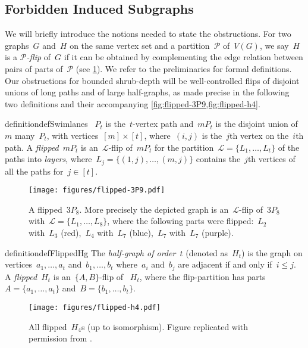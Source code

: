 \documentclass[11pt]{article}      \usepackage[margin=1in]{geometry}  \usepackage{microtype}
\theoremstyle{definition}
\newcommand{\LL}{\mathcal{L}}
\newcommand{\PP}{\mathcal{P}}
\renewcommand{\le}{\leqslant}
\renewcommand{\leq}{\le}
\begin{document}
\subsection*{Forbidden Induced Subgraphs}
We will briefly introduce the notions needed to state the obstructions.
For two graphs~$G$ and~$H$ on the same vertex set and a partition~$\PP$ of~$V(G)$, we say~$H$ is a \emph{$\PP$-flip} of~$G$ if it can be obtained by complementing the edge relation between pairs of parts of~$\PP$ (see \cref{fig:flipped-3P9}).
We refer to the preliminaries for formal definitions.
Our obstructions for bounded shrub-depth will be well-controlled flips of disjoint unions of long paths and of large half-graphs, as made precise in the following two definitions and their accompanying \cref{fig:flipped-3P9,fig:flipped-h4}.

\begin{restatable}{definition}{defSwimlanes}
  \label{def:tpt}
 ~$P_t$ is the~$t$-vertex path and~$mP_t$ is the disjoint union of~$m$ many~$P_t$, with vertices~$[m]\times [t]$, where~$(i,j)$ is the~$j$th vertex on the~$i$th path.
  A \emph{flipped}~$mP_t$ is an~$\LL$-flip of~$mP_t$ for the partition~$\LL = \{L_1,\ldots, L_t\}$ of the paths into \emph{layers}, where~$L_j = \{(1,j),\ldots,(m,j)\}$ contains the~$j$th vertices of all the paths for~$j\in[t]$.
\end{restatable}

\begin{figure}[htbp]
  \centering
  \texttt{[image: figures/flipped-3P9.pdf]}
  \caption{A flipped~$3P_8$. More precisely the depicted  graph is an~$\LL$-flip of~$3P_8$ with~$\LL = \{L_1,\ldots,L_8\}$, where the following parts were flipped:~$L_2$ with~$L_3$ (red),~$L_4$ with~$L_7$ (blue),~$L_7$ with~$L_7$ (purple).}
  \label{fig:flipped-3P9}
\end{figure}


\begin{restatable}{definition}{defFlippedHg}
  \label{def:hg}
  The \emph{half-graph of order~$t$} (denoted as~$H_t$) is the graph on vertices~$a_{1}, \ldots, a_{t}$ and~$b_{1}, \ldots, b_{t}$ where~$a_i$ and~$b_j$ are adjacent if and only if~$i \leq j$.
  A \emph{flipped}~$H_t$ is an~$\{A,B\}$-flip of ~$H_t$, where the flip-partition has parts~$A =\{a_{1}, \ldots, a_{t}\}$ and~$B = \{b_{1}, \ldots, b_{t}\}$.
\end{restatable}

\begin{figure}[htbp]
  \centering
  \texttt{[image: figures/flipped-h4.pdf]}
  \caption{ 
  All flipped~$H_4$s (up to isomorphism).
  Figure replicated with permission from \cite[Fig.\ 2.5]{maehlmann-thesis}.
  }
  \label{fig:flipped-h4}
\end{figure}
\end{document}
